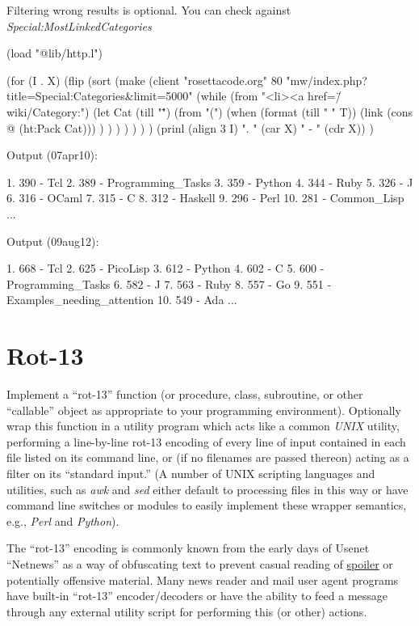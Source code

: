 Filtering wrong results is optional. You can check against
\emph{Special:MostLinkedCategories}



\begin{wideverbatim}

(load "@lib/http.l")

(for (I . X)
   (flip
      (sort
         (make
            (client "rosettacode.org" 80
               "mw/index.php?title=Special:Categories\&limit=5000"
               (while (from "<li><a href=\"/wiki/Category:")
                  (let Cat (till "\"")
                     (from "(")
                     (when (format (till " " T))
                        (link (cons @ (ht:Pack Cat))) ) ) ) ) ) ) )
   (prinl (align 3 I) ". " (car X) " - " (cdr X)) )

Output (07apr10):

  1. 390 - Tcl
  2. 389 - Programming_Tasks
  3. 359 - Python
  4. 344 - Ruby
  5. 326 - J
  6. 316 - OCaml
  7. 315 - C
  8. 312 - Haskell
  9. 296 - Perl
 10. 281 - Common_Lisp
...


Output (09aug12):

  1. 668 - Tcl
  2. 625 - PicoLisp
  3. 612 - Python
  4. 602 - C
  5. 600 - Programming_Tasks
  6. 582 - J
  7. 563 - Ruby
  8. 557 - Go
  9. 551 - Examples_needing_attention
 10. 549 - Ada
...

\end{wideverbatim}

\pagebreak{}
\section*{Rot-13}

Implement a ``rot-13'' function (or procedure, class, subroutine, or
other ``callable'' object as appropriate to your programming
environment). Optionally wrap this function in a utility program which
acts like a common \emph{UNIX} utility, performing a
line-by-line rot-13 encoding of every line of input contained in each
file listed on its command line, or (if no filenames are passed thereon)
acting as a filter on its ``standard input.'' (A number of UNIX
scripting languages and utilities, such as \emph{awk} and \emph{sed}
either default to processing files in this way or have command line
switches or modules to easily implement these wrapper semantics, e.g.,
\emph{Perl} and \emph{Python}).

The ``rot-13'' encoding is commonly known from the early days of Usenet
``Netnews'' as a way of obfuscating text to prevent casual reading of
\href{http://en.wikipedia.org/wiki/Spoiler\_(media)}{spoiler} or
potentially offensive material. Many news reader and mail user agent
programs have built-in ``rot-13'' encoder/decoders or have the ability
to feed a message through any external utility script for performing
this (or other) actions.

